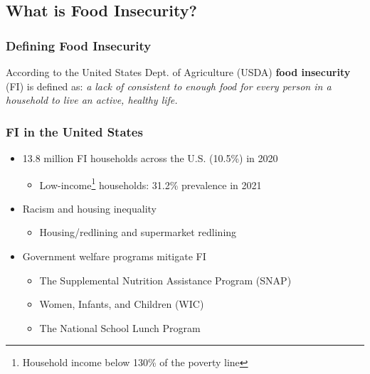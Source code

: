 \documentclass[aspectratio=169]{beamer}
\begin{document}
\subsection{What is Food Insecurity?}
\begin{frame}
	\frametitle{Defining Food Insecurity}
	
	
	According to the United States Dept. of Agriculture (USDA) \textbf{food insecurity} (FI) is defined as: \textit{a lack of consistent  to enough food for every person in a household to live an active, healthy life.}
	
\end{frame}

\begin{frame}
	\frametitle{FI in the United States}
	\begin{itemize}
		\item 13.8 million FI households  across the U.S. (10.5\%) in 2020
		\begin{itemize}
			\item Low-income\footnote{Household income below 130\% of the poverty line}  households: 31.2\% prevalence in 2021
		\end{itemize}
		\item Racism and housing inequality
		\begin{itemize}
			\item Housing/redlining and supermarket redlining
		\end{itemize}       
		\item Government welfare programs mitigate FI    
		 \begin{itemize}
			\item The Supplemental Nutrition Assistance Program (SNAP)
			\item Women, Infants, and Children (WIC)
			\item The National School Lunch Program
		\end{itemize}
	\end{itemize}
\end{frame}



\end{document}
